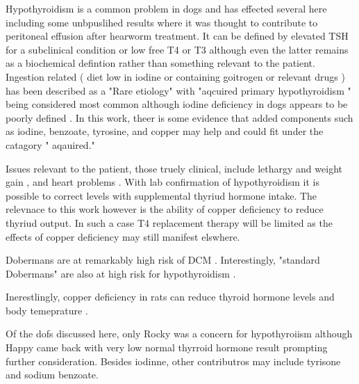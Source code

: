 {Hypothyroidism is a common problem in dogs and has effected
several here \cite{mmarchywka-MJM-2020-007rg}
including some unbpuslihed results where it was thought to contribute
to peritoneal effusion after hearworm treatment. 
It can be defined by elevated TSH for a subclinical condition
or low free T4 or T3 \cite{PMC4554113} although even the latter
remains as a biochemical defintion rather than something relevant
to the patient. 
Ingestion related ( diet low in iodine or containing goitrogen
or relevant drugs ) has been described as a "Rare etiology"
with "aqcuired primary hypothyroidism "  being considered
most common  although iodine deficiency in dogs appears
to be poorly defined 
\cite{Yun_Na_Lee_Case_Report_Technetium_2022}. 
In this work, theer is some evidence that added components
such as iodine, benzoate, tyrosine, and copper may help
and could fit under the catagory " aqauired."

Issues relevant to the patient, those truely clinical, include
lethargy and  weight gain
\cite{Dixon_Reid_Mooney_Epidemiological_clinical_haematological_1999}
, and heart problems
\cite{PMC5512679}
. 
With lab confirmation of hypothyroidism it is possible to 
correct levels with supplemental thyriud hormone intake. 
The relevnace to this work however is the ability
of copper deficiency to reduce thyriud output. In such
a case T4 replacement therapy will be limited as the
effects of copper deficiency may still manifest elswhere.


Dobermans are at remarkably high risk of DCM 
\cite{Ezer_Saarinen_Katayama_Identification_novel_genetic_2023}.
Interestingly, "standard Dobermans" are also at high risk for hypothyroidism
\cite{PMC9552398}.

Inerestlingly, copper deficiency in rats can reduce thyroid
hormone levels and body temeprature \cite{Lukaski_Hall_Marchello_Body_temperature_thyroid_1995}.

Of the dofs discussed here, only Rocky was a concern for hypothyroiism although
Happy came back with very low normal thyrroid hormone result prompting
further consideration. Besides iodinne, other contributros may include
tyrisone and sodium benzoate. 

} %
